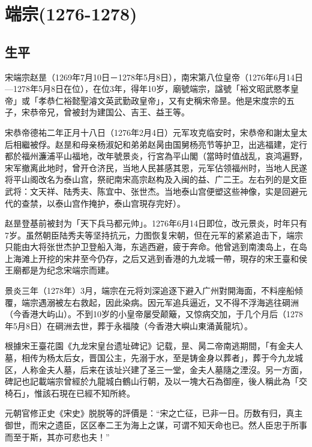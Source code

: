 
\section{端宗\tiny(1276-1278)}

\subsection{生平}

宋端宗赵昰（1269年7月10日－1278年5月8日），南宋第八位皇帝（1276年6月14日—1278年5月8日在位），在位3年，得年10岁，廟號端宗，諡號「裕文昭武愍孝皇帝」或「孝恭仁裕懿聖濬文英武勤政皇帝」，又有史稱宋帝昰。他是宋度宗的五子，宋恭帝兄，曾被封为建国公、吉王、益王等。

宋恭帝德祐二年正月十八日（1276年2月4日）元军攻克临安时，宋恭帝和謝太皇太后相繼被俘。赵昰和母亲杨淑妃和弟弟赵昺由国舅杨亮节等护卫，出逃福建，定行都於福州濂浦平山福地，改年號景炎，行宮為平山閣（當時时值战乱，哀鸿遍野，宋军撤离此地时，曾开仓济民，当地人民甚感其恩，元军佔领福州时，当地人民遂将平山阁改名为泰山宫，祭祀南宋高宗赵构及入闽的益、广二王。左右列的是文臣武将：文天祥、陆秀夫、陈宜中、张世杰。当地泰山宫便塑这些神像，实是回避元代的查禁，以泰山宫作掩护，泰山宫現存完好）。

赵昰登基前被封为「天下兵马都元帅」。1276年6月14日即位，改元景炎，时年只有7岁。虽然朝臣陆秀夫等坚持抗元，力图恢复宋朝，但在元军的紧紧追击下，端宗只能由大将张世杰护卫登船入海，东逃西避，疲于奔命。他曾逃到南澳岛上，在岛上海滩上开挖的宋井至今仍存，之后又逃到香港的九龙城一帶，現存的宋王臺和侯王廟都是为纪念宋端宗而建。

景炎三年（1278年）3月，端宗在元将刘深追逐下避入广州對開海面，不料座船倾覆，端宗遇溺被左右救起，因此染病。因元军追兵逼近，又不得不浮海逃往碙洲（今香港大屿山）。不到10岁的小皇帝屡受颠簸，又惊病交加，于几个月后（1278年5月8日）在碙洲去世，葬于永福陵（今香港大嶼山東涌黃龍坑）。

根據宋王臺花園《九龙宋皇台遗址碑记》记载，昰、昺二帝南逃期間，「有金夫人墓，相传为杨太后女，晋国公主，先溺于水，至是铸金身以葬者」，葬于今九龙城区，人称金夫人墓，后来在该址兴建了圣三一堂，金夫人墓隨之湮沒。另一方面，碑記也記載端宗曾經於九龍城白鶴山行朝，及以一塊大石為御座，後人稱此為「交椅石」，惟該石現在已經不知所終。

元朝官修正史《宋史》脱脱等的評價是：“宋之亡征，已非一日。历数有归，真主御世，而宋之遗臣，区区奉二王为海上之谋，可谓不知天命也已。然人臣忠于所事而至于斯，其亦可悲也夫！”


